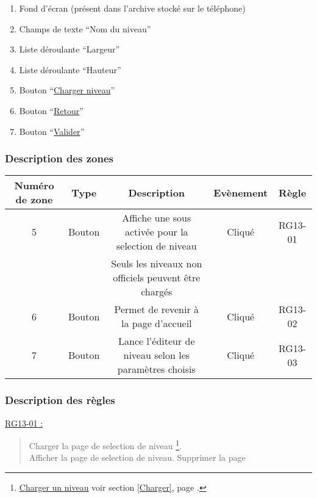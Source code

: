 \documentclass{report}
\begin{document}
		\begin{enumerate}
		  \item Fond d'écran (présent dans l'archive stocké sur le téléphone)
		  \item Champs de texte ``Nom du niveau''
		  \item Liste déroulante ``Largeur''
		  \item Liste déroulante ``Hauteur''
		  \item Bouton ``\hyperlink{Charger}{Charger niveau}''
		  \item Bouton ``\hyperlink{Accueil}{Retour}''
		  \item Bouton ``\hyperlink{Editeur}{Valider}''
		\end{enumerate}

		\subsubsection{Description des zones}
		
			\begin{tabular}{|c|c|c|c|c|} \hline
				Numéro de zone & Type  & Description & Evènement &	Règle \\\hline
				5 & Bouton & Affiche une sous activée pour la selection de niveau & Cliqué & RG13-01 \\
				  &        & Seuls les niveaux non officiels peuvent être chargés &        &         \\\hline
				6 & Bouton & Permet de revenir à la page d'accueil & Cliqué & RG13-02 \\\hline
				7 & Bouton & Lance l'éditeur de niveau selon les paramètres choisis & Cliqué & RG13-03 \\\hline 
			\end{tabular}
			
		\subsubsection{Description des règles}

			\underline{RG13-01 :}
				\begin{quote}
					Charger la page de selection de niveau%
						\footnote[1]{
							\hyperlink{Charger un niveau}{Charger un niveau}
							\og voir section \ref{Charger}, page \pageref{Charger}.\fg
						}.\\
					Afficher la page de selection de niveau\footnotemark[1].
					Supprimer la page
				\end{quote}
				
\end{document}
